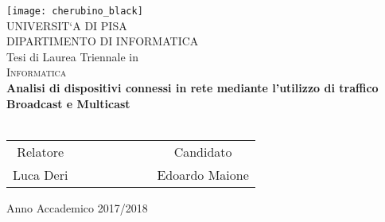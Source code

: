 



\begin{titlepage}
 \begin{center}
     \texttt{[image: cherubino\_black]}\\
     \vspace{1em}
     {\Large \textsc{UNIVERSIT`A DI PISA}}\\
     \vspace{1em}
     {\Large \textsc{DIPARTIMENTO DI INFORMATICA}}\\
     \vspace{2em}
     {\normalsize Tesi di Laurea Triennale in}\\
     \vspace{1em}
     {\Large \textsc{Informatica}}\\
     \vspace{5em}
     {\LARGE \textbf{Analisi di dispositivi connessi in rete mediante l'utilizzo di traffico \\Broadcast e Multicast}}\\
     \vspace{1em}
     {\LARGE \textbf{}}\\
 \end{center}

\vskip 2.5cm
  \begin{center}
    \begin{tabular}{c c c c c c c c}
      Relatore & & & & & & & Candidato \\[0.2cm]
      \large{Luca Deri} & & & & & & & \large{Edoardo Maione}\\[0.4cm]
    \end{tabular}
  \end{center}

\vskip 2cm
\begin{center}
{\normalsize Anno Accademico 2017/2018}
\end{center}
\end{titlepage}

